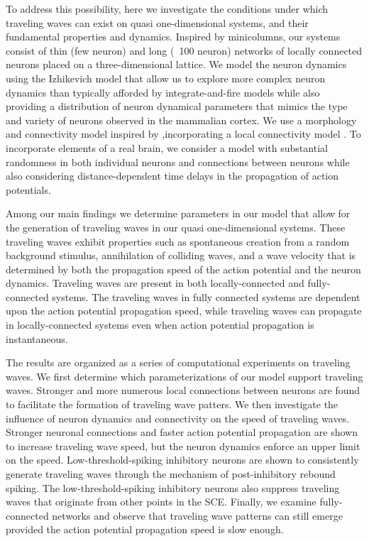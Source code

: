 To address this possibility, here we investigate the conditions under which traveling waves can exist on quasi one-dimensional systems, and their fundamental properties and dynamics.  
Inspired by minicolumns, our systems consist of thin (few neuron) and long (~100 neuron) networks of locally connected neurons placed on a three-dimensional lattice.  
We model the neuron dynamics using the Izhikevich model \citep{izhikevich2003} that allow us to explore more complex neuron dynamics than typically afforded by integrate-and-fire models \citep{keane2015}\citep{Senk2020} while also providing a distribution of neuron dynamical parameters that mimics the type and variety of neurons observed in the mammalian cortex.
We use a morphology and connectivity model inspired by \citet{maass2002},incorporating a local connectivity model \citep{Levy2012}\citep{Pyle2017}\citep{Fino2011}.
To incorporate elements of a real brain, we consider a model with substantial randomness in both individual neurons and connections between neurons while also considering  distance-dependent time delays in the propagation of action potentials.

Among our main findings we determine parameters in our model that allow for the generation of traveling waves in our quasi one-dimensional systems. 
These traveling waves exhibit properties such as spontaneous creation from a random background stimulus, annihilation of colliding waves, and a wave velocity that is determined by both the propagation speed of the action potential and the neuron dynamics.
Traveling waves are present in both locally-connected and fully-connected systems. 
The traveling waves in fully connected systems are dependent upon the action potential propagation speed, while traveling waves can propagate in locally-connected systems even when action potential propagation is instantaneous.

The results are organized as a series of computational experiments on traveling waves.
We first determine which parameterizations of our model support traveling waves.
Stronger and more numerous local connections between neurons are found to facilitate the formation of traveling wave patters.
We then investigate the influence of neuron dynamics and connectivity on the speed of traveling waves.
Stronger neuronal connections and faster action potential propagation are shown to increase traveling wave speed, but the neuron dynamics enforce an upper limit on the speed. 
Low-threshold-spiking inhibitory neurons are shown to consistently generate traveling waves through the mechanism of post-inhibitory rebound spiking.
The low-threshold-spiking inhibitory neurons also suppress traveling waves that originate from other points in the SCE.
Finally, we examine fully-connected networks and observe that traveling wave patterns can still emerge provided the action potential propagation speed is slow enough.

